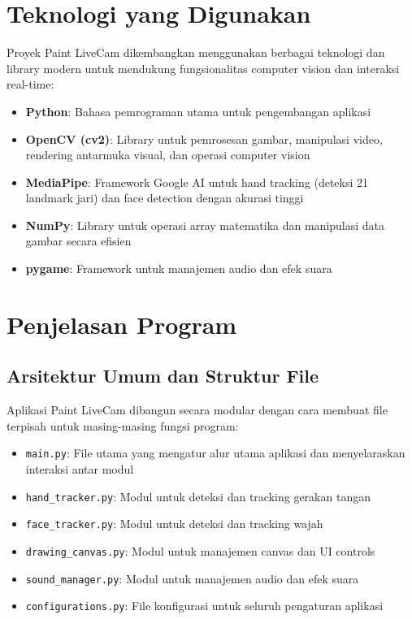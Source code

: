 \documentclass[11pt,a4paper]{article}
\begin{document}
\section{Teknologi yang Digunakan}

Proyek Paint LiveCam dikembangkan menggunakan berbagai teknologi dan library modern untuk mendukung fungsionalitas computer vision dan interaksi real-time:

\begin{itemize}
    \item \textbf{Python}: Bahasa pemrograman utama untuk pengembangan aplikasi
    \item \textbf{OpenCV (cv2)}: Library untuk pemrosesan gambar, manipulasi video, rendering antarmuka visual, dan operasi computer vision
    \item \textbf{MediaPipe}: Framework Google AI untuk hand tracking (deteksi 21 landmark jari) dan face detection dengan akurasi tinggi
    \item \textbf{NumPy}: Library untuk operasi array matematika dan manipulasi data gambar secara efisien
    \item \textbf{pygame}: Framework untuk manajemen audio dan efek suara
\end{itemize}

\section{Penjelasan Program}
\subsection{Arsitektur Umum dan Struktur File}
Aplikasi Paint LiveCam dibangun secara modular dengan cara membuat file terpisah untuk masing-masing fungsi program:

\begin{itemize}
\item \texttt{main.py}: File utama yang mengatur alur utama aplikasi dan menyelaraskan interaksi antar modul
\item \texttt{hand\_tracker.py}: Modul untuk deteksi dan tracking gerakan tangan
\item \texttt{face\_tracker.py}: Modul untuk deteksi dan tracking wajah
\item \texttt{drawing\_canvas.py}: Modul untuk manajemen canvas dan UI controls
\item \texttt{sound\_manager.py}: Modul untuk manajemen audio dan efek suara
\item \texttt{configurations.py}: File konfigurasi untuk seluruh pengaturan aplikasi
\end{itemize}
\end{document}
